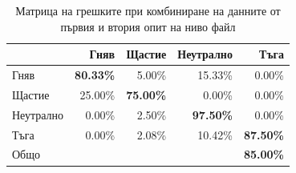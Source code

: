 \documentclass[9pt]{beamer}
\begin{document}
    \begin{frame}[c]
        \begin{center}
        \begin{table}[h]
            \begin{tabular}{|l|r r r r|} 
                \hline
                & Гняв & Щастие & Неутрално & Тъга \\ 
                \hline
                Гняв &  \textbf{80.33\%} & 5.00\% & 15.33\% & 0.00\% \\ 
                Щастие & 25.00\% & \textbf{75.00\%} & 0.00\% & 0.00\% \\ 
                Неутрално & 0.00\% & 2.50\% & \textbf{97.50\%} & 0.00\% \\ 
                Тъга & 0.00\% & 2.08\% & 10.42\% & \textbf{87.50\%}\\ 
                \hline
                \hline
                Общо & & & & \textbf{85.00\%}\\
                \hline
            \end{tabular}
            \caption*{Матрица на грешките при комбиниране на данните от първия и втория опит на ниво файл}
        \end{table}
        \end{center}
    \end{frame}
\end{document}
